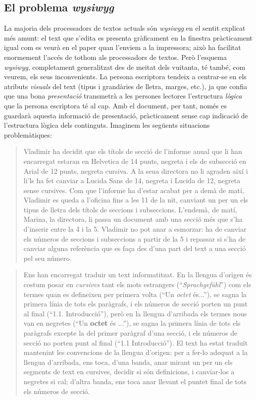 \subsection{El problema \emph{wysiwyg}}\label{s3:problema_wysiwyg}
La majoria dels processadors de textos actuals són \emph{wysiwyg} en
el sentit explicat més amunt: el text que s'edita es presenta
gràficament en la finestra pràcticament igual com es veurà en el paper
quan l'enviem a la impressora; això ha facilitat enormement l'accés de
tothom als processadors de textos. Però l'esquema \emph{wysiwyg},
completament generalitzat des de meitat dels vuitanta, té també, com
veurem, els seus inconvenients.  La persona escriptora tendeix a
centrar-se en els atributs \emph{visuals} del text (tipus i grandàries
de lletra, marges, etc.), ja que confia que una bona
\emph{presentació} transmetrà a les persones lectores l'estructura
\emph{lògica} que la persona escriptora té al cap.  Amb el document,
per tant, només es guardarà aquesta informació de presentació,
pràcticament sense cap indicació de l'estructura lògica dels
continguts. Imaginem les següents situacions problemàtiques:
  \begin{quote}
    Vladimir ha decidit que els títols de secció de l'informe anual
    que li han encarregat estaran en Helvetica de 14 punts, negreta i
    els de subsecció en Arial de 12 punts, negreta cursiva. A la seua
    directora no li agraden així i li'ls ha fet canviar a Lucida Sans
    de 14, negreta i Lucida de 12, negreta sense cursives. Com que
    l'informe ha d'estar acabat per a demà de matí, Vladimir es queda
    a l'oficina fins a les 11 de la nit, canviant un per un els tipus de
    lletra dels títols de seccions i subseccions. L'endemà, de matí,
    Marina, la directora, li passa un document amb una secció més que
    s'ha d'inserir entre la 4 i la 5. Vladimir no pot anar a esmorzar:
    ha de canviar els números de seccions i subseccions a partir de la
    5 i repassar si s'ha de canviar alguna referència que es faça des
    d'una part del text a una secció pel seu número.
  \end{quote}

  \begin{quote}
    Ens han encarregat traduir un text informatitzat. En la llengua
    d'origen és costum posar en \emph{cursives} tant els mots
    estrangers (``\emph{Sprachgefühl}'') com els termes quan es
    defineixen per primera volta (``Un \emph{octet} és...''), se sagna
    la primera línia de tots els paràgrafs, i els números de secció
    porten un punt al final (``1.1. Introducció''), però en la llengua
    d'arribada els termes nous van en negretes (``Un \textbf{octet} és
    ...''), se sagna la primera línia de tots els paràgrafs excepte la
    del primer paràgraf d'una secció, i els números de secció no
    porten punt al final (``1.1 Introducció''). El text ha estat
    traduït mantenint les convencions de la llengua d'origen: per a
    fer-lo adequat a la llengua d'arribada, ens toca, d'una banda,
    anar mirant un per un els segments de text en cursives, decidir si
    són definicions, i canviar-los a negretes si cal; d'altra banda,
    ens toca anar llevant el puntet final de tots els números de
    secció.
  \end{quote}
  
